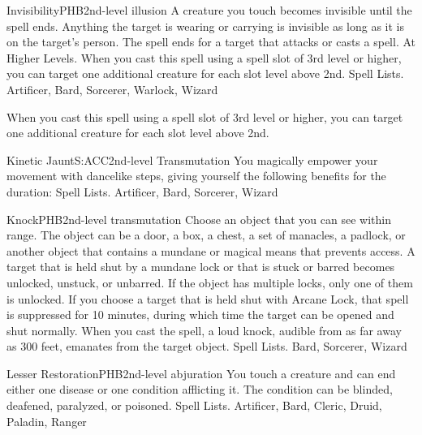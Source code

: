 \begin{spell}{Invisibility}{PHB}{2nd-level illusion}
{
}
A creature you touch becomes invisible until the spell ends. Anything the target is wearing or carrying is invisible as long as it is on the target’s person. The spell ends for a target that attacks or casts a spell.
At Higher Levels. When you cast this spell using a spell slot of 3rd level or higher, you can target one additional creature for each slot level above 2nd.
Spell Lists. Artificer, Bard, Sorcerer, Warlock, Wizard

 When you cast this spell using a spell slot of 3rd level or higher, you can target one additional creature for each slot level above 2nd.
\end{spell}

\begin{spell}{Kinetic Jaunt}{S:ACC}{2nd-level Transmutation}
{
}
You magically empower your movement with dancelike steps, giving yourself the following benefits for the duration:
Spell Lists. Artificer, Bard, Sorcerer, Wizard
\end{spell}

\begin{spell}{Knock}{PHB}{2nd-level transmutation}
{
}
Choose an object that you can see within range. The object can be a door, a box, a chest, a set of manacles, a padlock, or another object that contains a mundane or magical means that prevents access.
A target that is held shut by a mundane lock or that is stuck or barred becomes unlocked, unstuck, or unbarred. If the object has multiple locks, only one of them is unlocked.
If you choose a target that is held shut with Arcane Lock, that spell is suppressed for 10 minutes, during which time the target can be opened and shut normally.
When you cast the spell, a loud knock, audible from as far away as 300 feet, emanates from the target object.
Spell Lists. Bard, Sorcerer, Wizard
\end{spell}

\begin{spell}{Lesser Restoration}{PHB}{2nd-level abjuration}
{
}
You touch a creature and can end either one disease or one condition afflicting it. The condition can be blinded, deafened, paralyzed, or poisoned.
Spell Lists. Artificer, Bard, Cleric, Druid, Paladin, Ranger
\end{spell}

